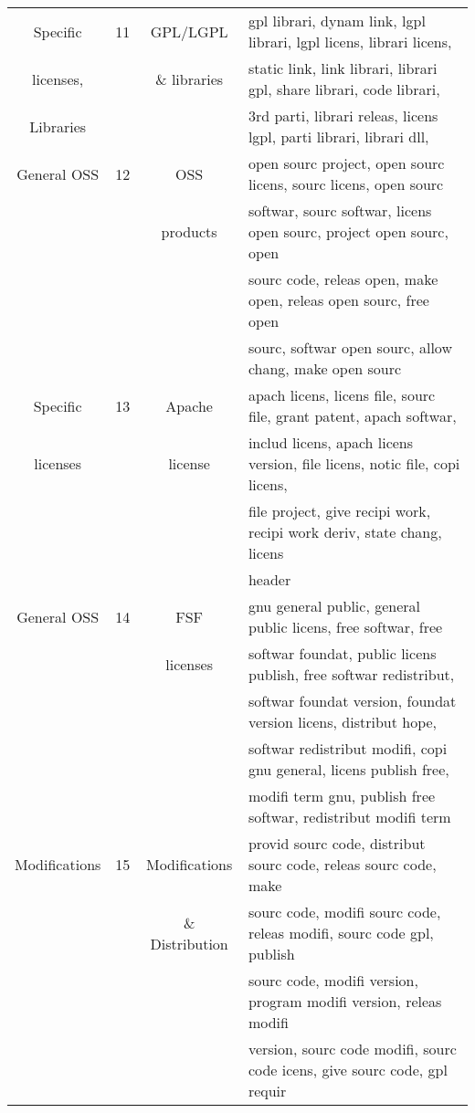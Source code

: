\begin{table}
\begin{adjustbox}{width=0.99\textwidth}
\begin{tabular}{cccl}
\hline
Specific& 11& GPL/LGPL &
gpl librari, 
dynam link, 
lgpl librari, 
lgpl licens, 
librari licens,\\
licenses,&& \& libraries&
static link, 
link librari, 
librari gpl, 
share librari, 
code librari, \\
Libraries&&&3rd parti, 
librari releas, 
licens lgpl, 
parti librari, 
librari dll, 
\\

\hline
General OSS& 12& OSS &
open sourc project, 
open sourc licens, 
sourc licens, 
open sourc \\
&& products &
softwar, 
sourc softwar, 
licens open sourc, 
project open sourc, 
open 
 \\
&&&
sourc code, 
releas open,
make open, 
releas open sourc, 
free open  \\
&&&
sourc, 
softwar open sourc, 
allow chang,
make open sourc
\\

\hline
Specific& 13& Apache &
apach licens, 
licens file, 
sourc file, 
grant patent, 
apach softwar, \\
licenses&&license&
includ licens, 
apach licens version, 
file licens, 
notic file,
copi licens, \\
&&& 
file project, 
give recipi work, 
recipi work deriv, 
state chang, 
licens \\
&&&header
\\

\hline
General OSS& 14& FSF &
gnu general public, 
general public licens, 
free softwar, 
free  
\\
&&licenses&
softwar foundat, 
public licens publish, 
free softwar redistribut, 
\\
&&&
softwar foundat version,
foundat version licens, 
distribut hope, 
 \\
&&&
softwar redistribut modifi,
copi gnu general, 
licens publish free, 
 \\
&&&
modifi term gnu,
publish free softwar, 
redistribut modifi term
\\

\hline
Modifications& 15& Modifications&
provid sourc code, 
distribut sourc code, 
releas sourc code, 
make  \\
&& \& Distribution &
sourc code,
modifi sourc code, 
releas modifi, 
sourc code gpl,
publish\\
&&& sourc code, 
modifi version, 
program modifi version, 
releas modifi\\
&&&  version, 
sourc code modifi, 
sourc code icens, 
give sourc code,
gpl requir
\\


\end{tabular}
\end{adjustbox}
\end{table}
